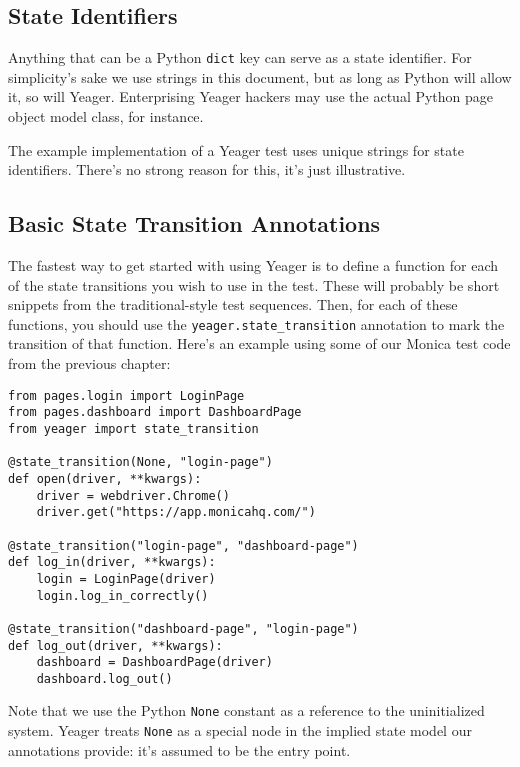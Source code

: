 \subsection{State Identifiers}
Anything that can be a Python \texttt{dict} key can serve as a state identifier. For simplicity's sake we use strings in this document, but as long as Python will allow it, so will Yeager. Enterprising Yeager hackers may use the actual Python page object model class, for instance.

The example implementation of a Yeager test uses unique strings for state identifiers. There's no strong reason for this, it's just illustrative.

\subsection{Basic State Transition Annotations}
The fastest way to get started with using Yeager is to define a function for each of the state transitions you wish to use in the test. These will probably be short snippets from the traditional-style test sequences. Then, for each of these functions, you should use the \texttt{yeager.state\_transition} annotation to mark the transition of that function. Here's an example using some of our Monica test code from the previous chapter:

\begin{verbatim}
from pages.login import LoginPage
from pages.dashboard import DashboardPage
from yeager import state_transition

@state_transition(None, "login-page")
def open(driver, **kwargs):
    driver = webdriver.Chrome()
    driver.get("https://app.monicahq.com/")

@state_transition("login-page", "dashboard-page")
def log_in(driver, **kwargs):
    login = LoginPage(driver)
    login.log_in_correctly()

@state_transition("dashboard-page", "login-page")
def log_out(driver, **kwargs):
    dashboard = DashboardPage(driver)
    dashboard.log_out()
\end{verbatim}

Note that we use the Python \texttt{None} constant as a reference to the uninitialized system. Yeager treats \texttt{None} as a special node in the implied state model our annotations provide: it's assumed to be the entry point.


